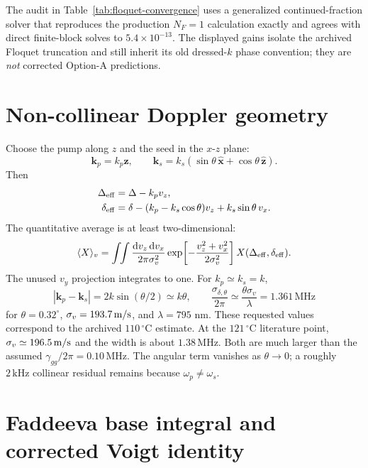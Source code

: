 \documentclass[11pt,a4paper]{article}
\newcommand{\dd}{\mathrm d}
\newcommand{\MHz}{\,\mathrm{MHz}}
\newcommand{\kHz}{\,\mathrm{kHz}}
\newcommand{\degC}{\,^{\circ}\mathrm C}
\begin{document}
The audit in Table~\ref{tab:floquet-convergence} uses a generalized
continued-fraction
solver that reproduces the production $N_F=1$ calculation exactly and agrees
with direct finite-block solves to $5.4\times10^{-13}$. The displayed gains
isolate the archived Floquet truncation and still inherit its old
dressed-$k$ phase convention; they are \emph{not} corrected Option-A
predictions.

\section{Non-collinear Doppler geometry}

Choose the pump along $z$ and the seed in the $x$-$z$ plane:
\[
\bm k_p=k_p\hat{\bm z},\qquad
\bm k_s=k_s(\sin\theta\,\hat{\bm x}+\cos\theta\,\hat{\bm z}).
\]
Then
\begin{align}
\Delta_{\rm eff}&=\Delta-k_pv_z,\\
\delta_{\rm eff}&=\delta-(k_p-k_s\cos\theta)v_z+k_s\sin\theta\,v_x .
\label{eq:doppler-detunings}
\end{align}
The quantitative average is at least two-dimensional:
\begin{equation}
\langle X\rangle_v=
\int\!\!\int\frac{\dd v_z\,\dd v_x}{2\pi\sigma_v^2}
\exp\!\left[-\frac{v_z^2+v_x^2}{2\sigma_v^2}\right]
X(\Delta_{\rm eff},\delta_{\rm eff}).
\label{eq:two-dimensional-velocity}
\end{equation}
The unused $v_y$ projection integrates to one. For $k_p\simeq k_s=k$,
\begin{equation}
|\bm k_p-\bm k_s|=2k\sin(\theta/2)\simeq k\theta,\qquad
\frac{\sigma_{\delta,\theta}}{2\pi}
\simeq\frac{\theta\sigma_v}{\lambda}=1.361\MHz
\label{eq:angular-doppler}
\end{equation}
for $\theta=0.32^\circ$, $\sigma_v=193.7\,{\rm m/s}$, and
$\lambda=795$ nm. These requested values correspond to the archived
$110\degC$ estimate. At the $121\degC$ literature point,
$\sigma_v\simeq196.5\,{\rm m/s}$ and the width is about $1.38\MHz$.
Both are much larger than the assumed
$\gamma_{gg}/2\pi=0.10\MHz$. The angular term vanishes as
$\theta\to0$; a roughly $2\kHz$ collinear residual remains because
$\omega_p\ne\omega_s$.

\section{Faddeeva base integral and corrected Voigt identity}
\end{document}
